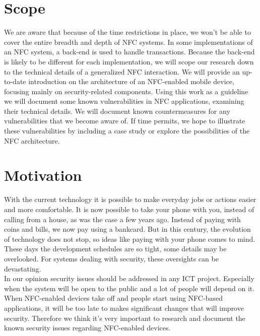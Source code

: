 \documentclass[11pt]{article} %
\begin{document}
\section{Scope}
We are aware that because of the time restrictions in place, we won't be able to cover the entire breadth and depth of NFC systems.
In some implementations of an NFC system, a back-end is used to handle transactions.
Because the back-end is likely to be different for each implementation, we will scope our research down to the technical details of a generalized NFC interaction.
We will provide an up-to-date introduction on the architecture of an NFC-enabled mobile device, focusing mainly on security-related components.
Using this work as a guideline we will document some known vulnerabilities in NFC applications, examining their technical details.
We will document known countermeasures for any vulnerabilities that we become aware of.
If time permits, we hope to illustrate these vulnerabilities by including a case study or explore the possibilities of the NFC architecture.

\section{Motivation}

With the current technology it is possible to make everyday jobs or actions easier and more comfortable.
It is now possible to take your phone with you, instead of calling from a house, as was the case a few years ago.
Instead of paying with coins and bills, we now pay using a bankcard.
But in this century, the evolution of technology does not stop, so ideas like paying with your phone comes to mind.
These days the development schedules are so tight, some details may be overlooked.
For systems dealing with security, these oversights can be devastating.
\\

\noindent In our opinion security issues should be addressed in any ICT project. Especially when the system will be open to the public and a lot of people will depend on it.
When NFC-enabled devices take off and people start using NFC-based applications, it will be too late to makes significant changes that will improve security.
Therefore we think it's very important to research and document the known security issues regarding NFC-enabled devices.
\end{document}
